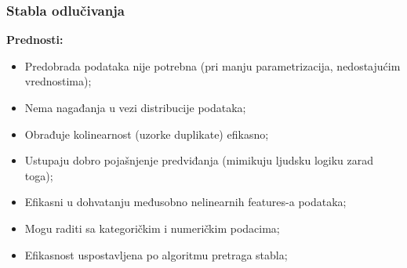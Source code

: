 \documentclass[fontsize=12bp, paper=a4]{scrarticle}
\begin{document}








\subsubsection{Stabla odlučivanja}
\textbf{Prednosti:}
\begin{itemize}
    \item Predobrada podataka nije potrebna (pri manju parametrizacija, nedostajućim vrednostima);
    \item Nema nagađanja u vezi distribucije podataka;
    \item Obrađuje kolinearnost (uzorke duplikate)\cite{colinear} efikasno;
    \item Ustupaju dobro pojašnjenje predviđanja (mimikuju ljudsku logiku zarad toga);
    \item Efikasni u dohvatanju međusobno nelinearnih features-a podataka;
    \item Mogu raditi sa kategoričkim i numeričkim podacima;
    \item Efikasnost uspostavljena po algoritmu pretraga stabla;
\end{itemize}
\end{document}
